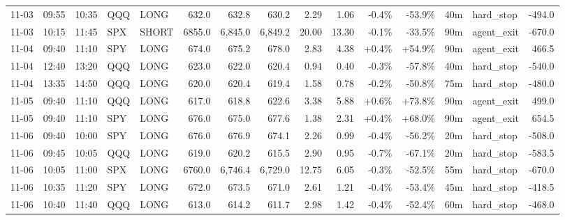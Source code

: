 \documentclass[11pt,a4paper,twoside]{article}
\begin{document}
\begin{landscape}
\begin{center}
\begin{longtable}{>{\color{txtmain}}l l l l l r r r r r r r r >{\color{txtmain}}l r}
11-03 & 09:55 & 10:35 & QQQ & LONG & 632.0 & 632.8 & 630.2 & 2.29 & 1.06 & \textcolor{lossred}{-0.4\%} & \textcolor{lossred}{-53.9\%} & 40m & hard\_stop & \textcolor{lossred}{-494.0} \\
11-03 & 10:15 & 11:45 & SPX & SHORT & 6855.0 & 6,845.0 & 6,849.2 & 20.00 & 13.30 & \textcolor{lossred}{-0.1\%} & \textcolor{lossred}{-33.5\%} & 90m & agent\_exit & \textcolor{lossred}{-670.0} \\
11-04 & 09:40 & 11:10 & SPY & LONG & 674.0 & 675.2 & 678.0 & 2.83 & 4.38 & \textcolor{wingreen}{+0.4\%} & \textcolor{wingreen}{+54.9\%} & 90m & agent\_exit & \textcolor{wingreen}{466.5} \\
11-04 & 12:40 & 13:20 & QQQ & LONG & 623.0 & 622.0 & 620.4 & 0.94 & 0.40 & \textcolor{lossred}{-0.3\%} & \textcolor{lossred}{-57.8\%} & 40m & hard\_stop & \textcolor{lossred}{-540.0} \\
11-04 & 13:35 & 14:50 & QQQ & LONG & 620.0 & 620.4 & 619.4 & 1.58 & 0.78 & \textcolor{lossred}{-0.2\%} & \textcolor{lossred}{-50.8\%} & 75m & hard\_stop & \textcolor{lossred}{-480.0} \\
11-05 & 09:40 & 11:10 & QQQ & LONG & 617.0 & 618.8 & 622.6 & 3.38 & 5.88 & \textcolor{wingreen}{+0.6\%} & \textcolor{wingreen}{+73.8\%} & 90m & agent\_exit & \textcolor{wingreen}{499.0} \\
11-05 & 09:40 & 11:10 & SPY & LONG & 676.0 & 675.0 & 677.6 & 1.38 & 2.31 & \textcolor{wingreen}{+0.4\%} & \textcolor{wingreen}{+68.0\%} & 90m & agent\_exit & \textcolor{wingreen}{654.5} \\
11-06 & 09:40 & 10:00 & SPY & LONG & 676.0 & 676.9 & 674.1 & 2.26 & 0.99 & \textcolor{lossred}{-0.4\%} & \textcolor{lossred}{-56.2\%} & 20m & hard\_stop & \textcolor{lossred}{-508.0} \\
11-06 & 09:45 & 10:05 & QQQ & LONG & 619.0 & 620.2 & 615.5 & 2.90 & 0.95 & \textcolor{lossred}{-0.7\%} & \textcolor{lossred}{-67.1\%} & 20m & hard\_stop & \textcolor{lossred}{-583.5} \\
11-06 & 10:05 & 11:00 & SPX & LONG & 6760.0 & 6,746.4 & 6,729.0 & 12.75 & 6.05 & \textcolor{lossred}{-0.3\%} & \textcolor{lossred}{-52.5\%} & 55m & hard\_stop & \textcolor{lossred}{-670.0} \\
11-06 & 10:35 & 11:20 & SPY & LONG & 672.0 & 673.5 & 671.0 & 2.61 & 1.21 & \textcolor{lossred}{-0.4\%} & \textcolor{lossred}{-53.4\%} & 45m & hard\_stop & \textcolor{lossred}{-418.5} \\
11-06 & 10:40 & 11:40 & QQQ & LONG & 613.0 & 614.2 & 611.7 & 2.98 & 1.42 & \textcolor{lossred}{-0.4\%} & \textcolor{lossred}{-52.4\%} & 60m & hard\_stop & \textcolor{lossred}{-468.0} \\

\end{longtable}
\end{center}
\end{landscape}
\end{document}
